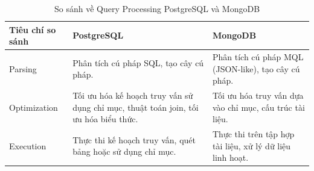 \begin{table}[H]
    \centering
    \begin{tabular}{|L{3.2cm}|L{5cm}|L{5cm}|} \hline 
         \textbf{Tiêu chí so sánh }&  \textbf{PostgreSQL}&  \textbf{MongoDB}\\ \hline 
         Parsing &  Phân tích cú pháp SQL, tạo cây cú pháp. & Phân tích cú pháp MQL (JSON-like), tạo cây cú pháp.\\ \hline 
         Optimization &  Tối ưu hóa kế hoạch truy vấn sử dụng chỉ mục, thuật toán join, tối ưu hóa biểu thức. & Tối ưu hóa truy vấn dựa vào chỉ mục, cấu trúc tài liệu.\\ \hline 
         Execution &  Thực thi kế hoạch truy vấn, quét bảng hoặc sử dụng chỉ mục. &  Thực thi trên tập hợp tài liệu, xử lý dữ liệu linh hoạt.\\ \hline
    \end{tabular}
    \caption{So sánh về Query Processing PostgreSQL và MongoDB}
    \label{tab:query_processing}
\end{table}
\newpage
